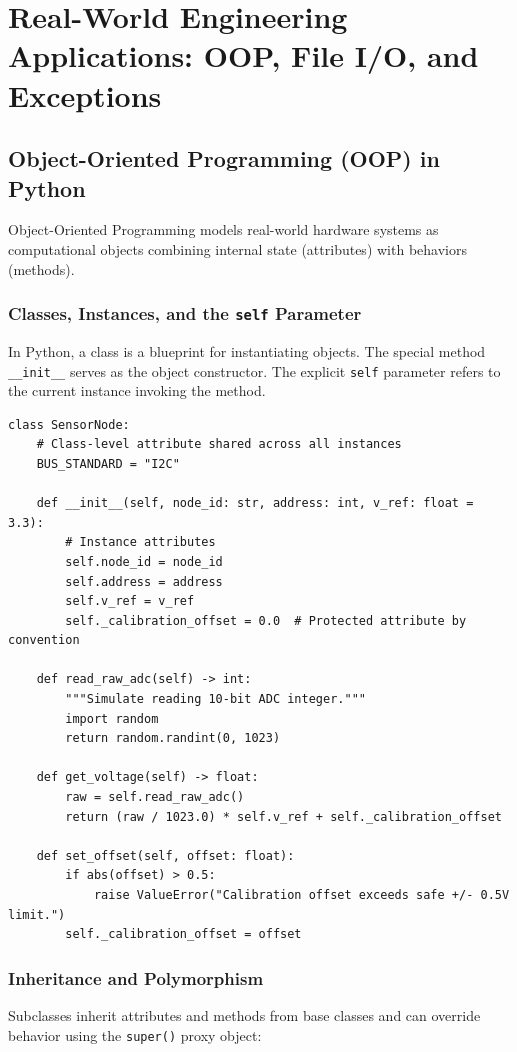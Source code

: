 \chapter{Real-World Engineering Applications: OOP, File I/O, and Exceptions}
\label{ch:real_world_applications}

\section{Object-Oriented Programming (OOP) in Python}

Object-Oriented Programming models real-world hardware systems as computational objects combining internal state (attributes) with behaviors (methods).

\subsection{Classes, Instances, and the \texttt{self} Parameter}
In Python, a class is a blueprint for instantiating objects. The special method \texttt{\_\_init\_\_} serves as the object constructor. The explicit \texttt{self} parameter refers to the current instance invoking the method.

\begin{lstlisting}[caption={Modeling an Embedded Analog Sensor Class}]
class SensorNode:
    # Class-level attribute shared across all instances
    BUS_STANDARD = "I2C"
    
    def __init__(self, node_id: str, address: int, v_ref: float = 3.3):
        # Instance attributes
        self.node_id = node_id
        self.address = address
        self.v_ref = v_ref
        self._calibration_offset = 0.0  # Protected attribute by convention
        
    def read_raw_adc(self) -> int:
        """Simulate reading 10-bit ADC integer."""
        import random
        return random.randint(0, 1023)
        
    def get_voltage(self) -> float:
        raw = self.read_raw_adc()
        return (raw / 1023.0) * self.v_ref + self._calibration_offset
        
    def set_offset(self, offset: float):
        if abs(offset) > 0.5:
            raise ValueError("Calibration offset exceeds safe +/- 0.5V limit.")
        self._calibration_offset = offset
\end{lstlisting}

\subsection{Inheritance and Polymorphism}
Subclasses inherit attributes and methods from base classes and can override behavior using the \texttt{super()} proxy object:

